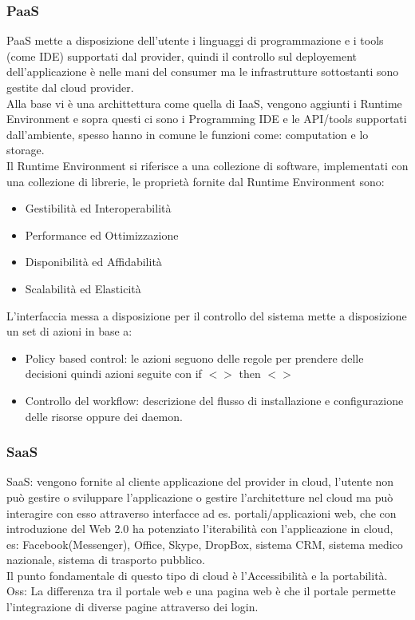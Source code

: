 \documentclass[11pt, twocolumn]{article}
\newenvironment{myitemize}
{ \begin{itemize}[topsep=0ex]
		\setlength{\itemsep}{0pt}
		\setlength{\parskip}{0pt}
		\setlength{\parsep}{0pt}     }
	{ \end{itemize}                  }
\begin{document}
\subsubsection{PaaS}
PaaS mette a disposizione dell'utente i linguaggi di programmazione e i tools (come IDE) supportati dal provider, quindi il controllo sul deployement dell'applicazione è nelle mani del consumer ma le infrastrutture sottostanti sono gestite dal cloud provider.
\\
Alla base vi è una archittettura come quella di IaaS, vengono aggiunti i Runtime Environment e sopra questi ci sono i Programming IDE e le API/tools supportati dall'ambiente, spesso hanno in comune le funzioni come: computation e lo storage.\\
Il Runtime Environment si riferisce a una collezione di software, implementati con una collezione di librerie, le proprietà fornite dal Runtime Environment sono:
\begin{myitemize}
	\item Gestibilità ed Interoperabilità
	\item Performance ed Ottimizzazione
	\item Disponibilità ed Affidabilità
	\item Scalabilità ed Elasticità
\end{myitemize}
L'interfaccia messa a disposizione per il controllo del sistema mette a disposizione un set di azioni in base a:
\begin{itemize}
	\item Policy based control: le azioni seguono delle regole per prendere delle decisioni quindi azioni seguite con if $<>$ then $<>$
	\item Controllo del workflow: descrizione del flusso di installazione e configurazione delle risorse oppure dei daemon.
\end{itemize}

\subsubsection{SaaS}
SaaS: vengono fornite al cliente applicazione del provider in cloud, l'utente non può gestire o sviluppare l'applicazione o gestire l'architetture nel cloud ma può interagire con esso attraverso interfacce ad es. portali/applicazioni web, che con introduzione del Web 2.0 ha potenziato l'iterabilità con l'applicazione in cloud, es: Facebook(Messenger), Office, Skype, DropBox, sistema CRM, sistema medico nazionale, sistema di trasporto pubblico.\\
Il punto fondamentale di questo tipo di cloud è l'Accessibilità e la portabilità.\\
Oss: La differenza tra il portale web e una pagina web è che il portale permette l'integrazione di diverse pagine attraverso dei login.
\end{document}

